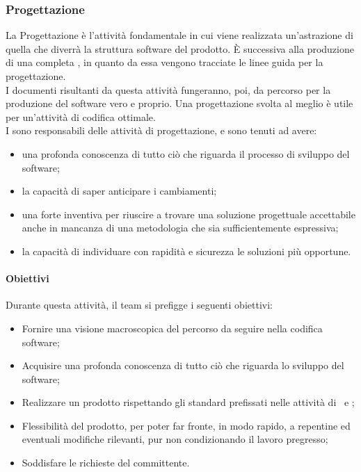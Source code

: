	\subsubsection{Progettazione}
	La Progettazione è l'attività fondamentale in cui viene realizzata un'astrazione di quella che diverrà la struttura software del prodotto. \MakeUppercase{è} successiva alla produzione di una completa \AdR, in quanto da essa vengono tracciate le linee guida per la progettazione.\\
	I documenti risultanti da questa attività fungeranno, poi, da percorso per la produzione del software vero e proprio. Una progettazione svolta al meglio è utile per un'attività di codifica ottimale.\\
	I \textit{\Progs} sono responsabili delle attività di progettazione, e sono tenuti ad avere:
	\begin{itemize}
		\item una profonda conoscenza di tutto ciò che riguarda il processo di sviluppo del software;
		\item la capacità di saper anticipare i cambiamenti;
		\item una forte inventiva per riuscire a trovare una soluzione progettuale accettabile anche in mancanza di una metodologia che sia sufficientemente espressiva;
		\item la capacità di individuare con rapidità e sicurezza le soluzioni più opportune.
	\end{itemize}
	
		\paragraph{Obiettivi}
		Durante questa attività, il team si prefigge i seguenti obiettivi:
		\begin{itemize}
			\item Fornire una visione macroscopica del percorso da seguire nella codifica software;
			\item Acquisire una profonda conoscenza di tutto ciò che riguarda lo sviluppo del software;
			\item Realizzare un prodotto rispettando gli standard prefissati nelle attività di \SdF\ e \AdR;
			\item Flessibilità del prodotto, per poter far fronte, in modo rapido, a repentine ed eventuali modifiche rilevanti, pur non condizionando il lavoro pregresso;
			\item Soddisfare le richieste del committente.
		\end{itemize}
		
